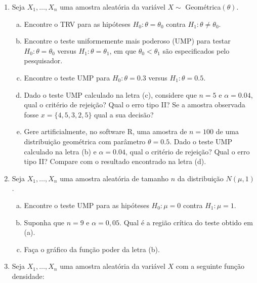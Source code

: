 \documentclass[10pt,brazil,addpoints]{exam}
\begin{document}
\begin{enumerate}[1.]

\item Seja $X_1, \ldots, X_n$ uma amostra aleatória da variável $X \sim $ Geométrica$(\theta)$.

\begin{enumerate}[a)]
\item Encontre o TRV para as hipóteses $H_0: \theta=\theta_0$ contra $H_1: \theta \neq \theta_0$.

\item Encontre o teste uniformemente mais poderoso (UMP) para testar $H_0: \theta=\theta_0$ versus $H_1: \theta=\theta_1$, em que $\theta_0<\theta_1$ são especificados pelo pesquisador.

\item  Encontre o teste UMP para $H_0: \theta=0.3$ versus $H_1: \theta=0.5$.

\item Dado o teste UMP calculado na letra (c), considere que $n=5$ e $\alpha=0.04$, qual o critério de rejeição? Qual o erro tipo II? Se a amostra observada fosse $x=\{4,5,3,2,5\}$ qual a sua decisão?

\item Gere artificialmente, no software R, uma amostra de $n= 100$ de uma distribuição geométrica com parâmetro $\theta=0.5$.  Dado o teste UMP calculado na letra (b) e $\alpha=0.04$, qual o critério de rejeição? Qual o erro tipo II? Compare com o resultado encontrado na letra (d).

\end{enumerate}

\item Seja $X_1, \ldots, X_n$ uma amostra aleatória de tamanho $n$ da distribuição $N(\mu, 1)$.


\begin{enumerate}[a)]
\item Encontre o teste UMP para as hipóteses $H_0: \mu=0$ contra $H_1: \mu=1$.

\item Suponha que $n=9$ e $\alpha=0,05$. Qual é a região crítica do teste obtido em (a).

\item Faça o gráfico da função poder da letra (b).
\end{enumerate}


\item Seja $X_1, \ldots, X_n$ uma amostra aleatória da variável $X$ com a seguinte função densidade:


\end{enumerate}
\end{document}
